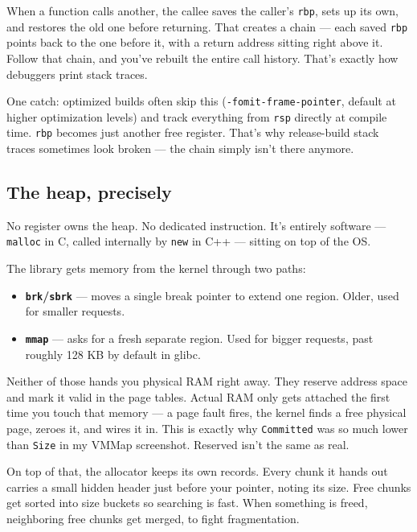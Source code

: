 \documentclass[11pt,a4paper]{article}
\begin{document}
When a function calls another, the callee saves the caller's \texttt{rbp}, sets up its own, and restores the old one before returning. That creates a chain --- each saved \texttt{rbp} points back to the one before it, with a return address sitting right above it. Follow that chain, and you've rebuilt the entire call history. That's exactly how debuggers print stack traces.

One catch: optimized builds often skip this (\texttt{-fomit-frame-pointer}, default at higher optimization levels) and track everything from \texttt{rsp} directly at compile time. \texttt{rbp} becomes just another free register. That's why release-build stack traces sometimes look broken --- the chain simply isn't there anymore.

\subsection{The heap, precisely}

No register owns the heap. No dedicated instruction. It's entirely software --- \texttt{malloc} in C, called internally by \texttt{new} in C++ --- sitting on top of the OS.

The library gets memory from the kernel through two paths:

\begin{itemize}
\item \textbf{\texttt{brk}/\texttt{sbrk}} --- moves a single break pointer to extend one region. Older, used for smaller requests.
\item \textbf{\texttt{mmap}} --- asks for a fresh separate region. Used for bigger requests, past roughly 128 KB by default in glibc.
\end{itemize}

Neither of those hands you physical RAM right away. They reserve address space and mark it valid in the page tables. Actual RAM only gets attached the first time you touch that memory --- a page fault fires, the kernel finds a free physical page, zeroes it, and wires it in. This is exactly why \texttt{Committed} was so much lower than \texttt{Size} in my VMMap screenshot. Reserved isn't the same as real.

On top of that, the allocator keeps its own records. Every chunk it hands out carries a small hidden header just before your pointer, noting its size. Free chunks get sorted into size buckets so searching is fast. When something is freed, neighboring free chunks get merged, to fight fragmentation.
\end{document}
